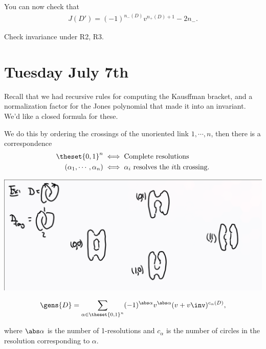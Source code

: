 \begin{remark}

You can now check that
\begin{align*}
J(D') = (-1)^{n_-(D)} v^{n_+(D) + 1} - 2n_-
.\end{align*}

\end{remark}

\begin{exercise}[?]

Check invariance under R2, R3.

\end{exercise}

\hypertarget{tuesday-july-7th}{%
\section{Tuesday July 7th}\label{tuesday-july-7th}}

Recall that we had recursive rules for computing the Kausffman bracket,
and a normalization factor for the Jones polynomial that made it into an
invariant. We'd like a closed formula for these.

We do this by ordering the crossings of the unoriented link
\(1, \cdots, n\), then there is a correspondence
\begin{align*}
\theset{0, 1}^n &\iff \text{Complete resolutions} \\
(\alpha_1, \cdots, \alpha_n) &\iff \alpha_i \text{ resolves the $i$th crossing}
.\end{align*}

\begin{example}

\includegraphics{figures/image_2020-07-07-11-07-33.png}

\end{example}

\begin{claim}

\begin{align*}
\gens{D} = \sum_{\alpha \in \theset{0, 1}^n} (-1)^{\abs \alpha}  v^{\abs \alpha} (v+v\inv)^{c_\alpha(D)}
,\end{align*}

where \(\abs \alpha\) is the number of 1-resolutions and \(c_\alpha\) is
the number of circles in the resolution corresponding to \(\alpha\).

\end{claim}

